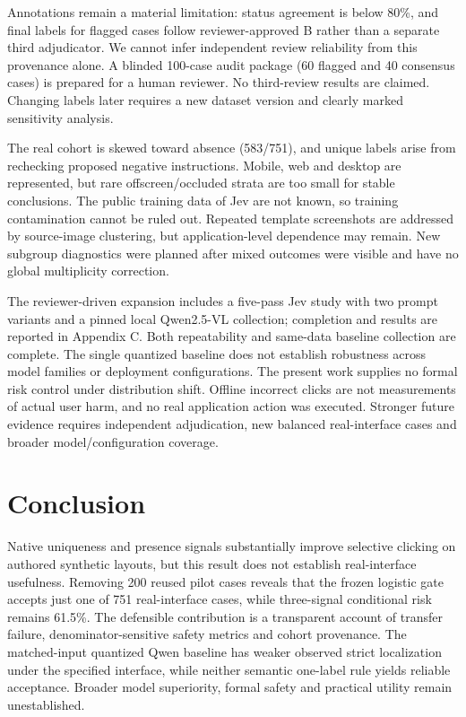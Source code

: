 \documentclass[10pt]{article}
\begin{document}
Annotations remain a material limitation: status agreement is below 80\%, and final labels for flagged cases follow reviewer-approved B rather than a separate third adjudicator. We cannot infer independent review reliability from this provenance alone. A blinded 100-case audit package (60 flagged and 40 consensus cases) is prepared for a human reviewer. No third-review results are claimed. Changing labels later requires a new dataset version and clearly marked sensitivity analysis.

The real cohort is skewed toward absence (583/751), and unique labels arise from rechecking proposed negative instructions. Mobile, web and desktop are represented, but rare offscreen/occluded strata are too small for stable conclusions. The public training data of Jev are not known, so training contamination cannot be ruled out. Repeated template screenshots are addressed by source-image clustering, but application-level dependence may remain. New subgroup diagnostics were planned after mixed outcomes were visible and have no global multiplicity correction.

The reviewer-driven expansion includes a five-pass Jev study with two prompt variants and a pinned local Qwen2.5-VL collection; completion and results are reported in Appendix C. Both repeatability and same-data baseline collection are complete. The single quantized baseline does not establish robustness across model families or deployment configurations. The present work supplies no formal risk control under distribution shift. Offline incorrect clicks are not measurements of actual user harm, and no real application action was executed. Stronger future evidence requires independent adjudication, new balanced real-interface cases and broader model/configuration coverage.

\section*{Conclusion}
Native uniqueness and presence signals substantially improve selective clicking on authored synthetic layouts, but this result does not establish real-interface usefulness. Removing 200 reused pilot cases reveals that the frozen logistic gate accepts just one of 751 real-interface cases, while three-signal conditional risk remains 61.5\%. The defensible contribution is a transparent account of transfer failure, denominator-sensitive safety metrics and cohort provenance. The matched-input quantized Qwen baseline has weaker observed strict localization under the specified interface, while neither semantic one-label rule yields reliable acceptance. Broader model superiority, formal safety and practical utility remain unestablished.
\end{document}
